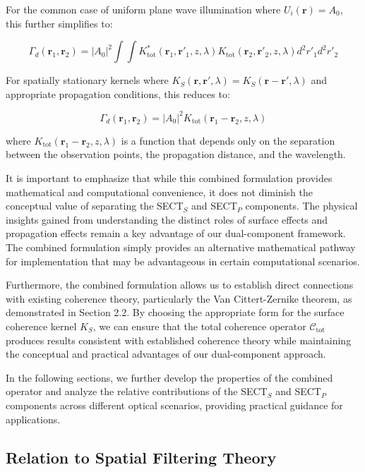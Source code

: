 \documentclass[a4paper,12pt]{article}
\begin{document}
For the common case of uniform plane wave illumination where $U_i(\bm{r}) = A_0$, this further simplifies to:

\begin{equation}
\Gamma_d(\bm{r}_1, \bm{r}_2) = |A_0|^2 \int\int K_{\text{tot}}^*(\bm{r}_1, \bm{r}'_1, z, \lambda) K_{\text{tot}}(\bm{r}_2, \bm{r}'_2, z, \lambda) d^2r'_1 d^2r'_2
\end{equation}

For spatially stationary kernels where $K_S(\bm{r}, \bm{r}', \lambda) = K_S(\bm{r} - \bm{r}', \lambda)$ and appropriate propagation conditions, this reduces to:

\begin{equation}
\Gamma_d(\bm{r}_1, \bm{r}_2) = |A_0|^2 K_{\text{tot}}(\bm{r}_1 - \bm{r}_2, z, \lambda)
\end{equation}

where $K_{\text{tot}}(\bm{r}_1 - \bm{r}_2, z, \lambda)$ is a function that depends only on the separation between the observation points, the propagation distance, and the wavelength.

It is important to emphasize that while this combined formulation provides mathematical and computational convenience, it does not diminish the conceptual value of separating the SECT$_S$ and SECT$_P$ components. The physical insights gained from understanding the distinct roles of surface effects and propagation effects remain a key advantage of our dual-component framework. The combined formulation simply provides an alternative mathematical pathway for implementation that may be advantageous in certain computational scenarios.

Furthermore, the combined formulation allows us to establish direct connections with existing coherence theory, particularly the Van Cittert-Zernike theorem, as demonstrated in Section 2.2. By choosing the appropriate form for the 
surface coherence kernel $K_S$, we can ensure that the total coherence operator $\mathcal{C}_{\text{tot}}$ produces 
results consistent with established coherence theory while maintaining the conceptual and practical advantages of our 
dual-component approach.

In the following sections, we further develop the properties of the combined operator and analyze the relative contributions of the SECT$_S$ and SECT$_P$ components across different optical scenarios, providing practical guidance for applications.

\subsection{Relation to Spatial Filtering Theory} \label{sec:Relation_to_Spatial_Filtering_Theory}
\end{document}
